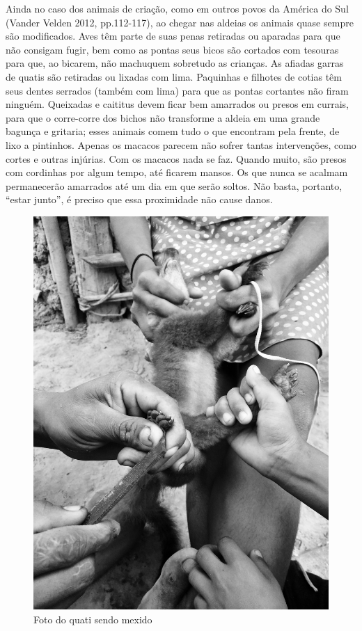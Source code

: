 Ainda no caso dos animais de criação, como em outros povos da América do
Sul (Vander Velden 2012, pp.112-117), ao chegar nas aldeias os animais
quase sempre são modificados. Aves têm parte de suas penas retiradas ou
aparadas para que não consigam fugir, bem como as pontas seus bicos são
cortados com tesouras para que, ao bicarem, não machuquem sobretudo as
crianças. As afiadas garras de quatis são retiradas ou lixadas com lima.
Paquinhas e filhotes de cotias têm seus dentes serrados (também com
lima) para que as pontas cortantes não firam ninguém. Queixadas e
caititus devem ficar bem amarrados ou presos em currais, para que o
corre-corre dos bichos não transforme a aldeia em uma grande bagunça e
gritaria; esses animais comem tudo o que encontram pela frente, de lixo
a pintinhos. Apenas os macacos parecem não sofrer tantas intervenções,
como cortes e outras injúrias. Com os macacos nada se faz. Quando muito,
são presos com cordinhas por algum tempo, até ficarem mansos. Os que
nunca se acalmam permanecerão amarrados até um dia em que serão soltos.
Não basta, portanto, ``estar junto'', é preciso que essa proximidade não
cause danos.

\begin{figure}[H]
\centering
  \includegraphics[width=\textwidth]{./imgs/IMG_0343}
\caption{Foto do quati sendo mexido}
\end{figure}

